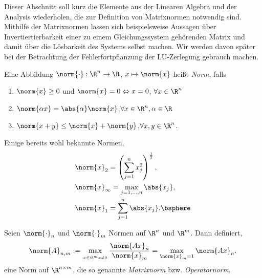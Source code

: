 Dieser Abschnitt soll kurz die Elemente aus der Linearen Algebra und der
Analysis wiederholen, die zur Definition von Matrixnormen notwendig sind.
Mithilfe der Matrixnormen lassen sich beispielsweise Aussagen über
Invertiertierbarkeit einer zu einem Gleichungssystem gehörenden Matrix und
damit über die Lösbarkeit des Systems selbst machen. Wir werden davon später
bei der Betrachtung der Fehlerfortpflanzung der LU-Zerlegung gebrauch machen.

\begin{defn}
\label{defn:2.8}
Eine Abbildung $\norm{\cdot}: \R^n\to\R$, $x\mapsto \norm{x}$ heißt
\emph{Norm}, falls
\begin{enumerate}[label=(\roman{*})]
  \item $\norm{x}\ge 0$ und $\norm{x}=0\Leftrightarrow x = 0$,\qquad
  $\forall x\in\R^n$
  \item $\norm{\alpha x}= \abs{\alpha}\norm{x}$,\qquad $\forall
  x\in\R^n,\alpha\in\R$
  \item $\norm{x+y}\le \norm{x}+\norm{y}$,\qquad $\forall x,y\in\R^n$.\fishhere
\end{enumerate}
\end{defn}

\begin{bspn} Einige bereits wohl bekannte Normen,
\begin{align*}
&\norm{x}_2 = \left(\sum\limits_{j=1}^n x_j^2\right)^{\frac{1}{2}},\\
&\norm{x}_\infty = \max\limits_{j=1,\ldots,n} \abs{x_j},\\
&\norm{x}_1 = \sum\limits_{j=1}^n \abs{x_j}.\bsphere
\end{align*}
\end{bspn}

\begin{prop}
\label{prop:2.9}
Seien $\norm{\cdot}_n$ und $\norm{\cdot}_m$ Normen auf $\R^n$ und $\R^m$. Dann
definiert,
\begin{align*}
\norm{A}_{n,m} := \max\limits_{\atop{x\in\R^m}{x\neq 0}}
\frac{\norm{Ax}_n}{\norm{x}_m} = \max\limits_{\norm{x}_m=1}\norm{Ax}_n.
\end{align*}
eine Norm auf $\R^{n\times m}$, die so genannte \emph{Matrixnorm} bzw.
\emph{Operatornorm}.\fishhere
\end{prop}

